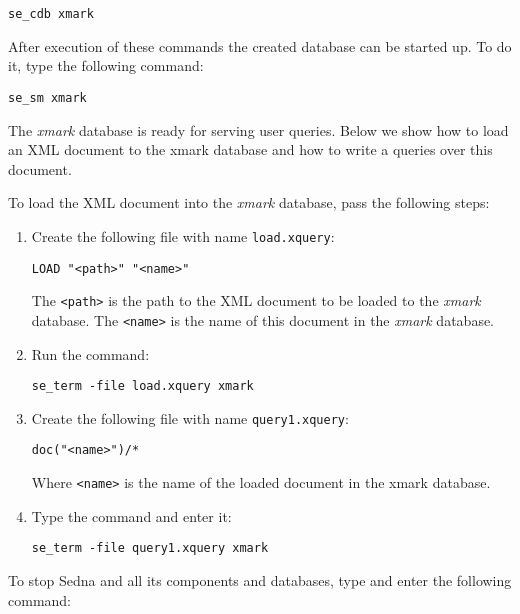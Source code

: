 \documentclass[a4paper,12pt]{article}
\begin{document}
\begin{verbatim}
se_cdb xmark
\end{verbatim}

After execution of these commands the created database can be started up. To do
it, type the following command:

\begin{verbatim}
se_sm xmark
\end{verbatim}

The \emph{xmark} database is ready for serving user queries. Below we show how
to load an XML document to the xmark database and how to write a queries over
this document.

To load the XML document into the \emph{xmark} database, pass the following
steps:

\begin{enumerate}
\item Create the following file with name \verb!load.xquery!:

\begin{verbatim}
LOAD "<path>" "<name>"
\end{verbatim}

The \verb!<path>! is the path to the XML document to be loaded to the
\emph{xmark} database. The \verb!<name>! is the name of this document in the
\emph{xmark} database.

\item Run the command:

\begin{verbatim}
se_term -file load.xquery xmark
\end{verbatim}

\item Create the following file with name \verb!query1.xquery!:

\begin{verbatim}
doc("<name>")/*
\end{verbatim}

Where \verb!<name>! is the name of the loaded document in the xmark database.

\item Type the command and enter it:

\begin{verbatim}
se_term -file query1.xquery xmark
\end{verbatim}
\end{enumerate}

To stop Sedna and all its components and databases, type and enter the following
command:
\end{document}
